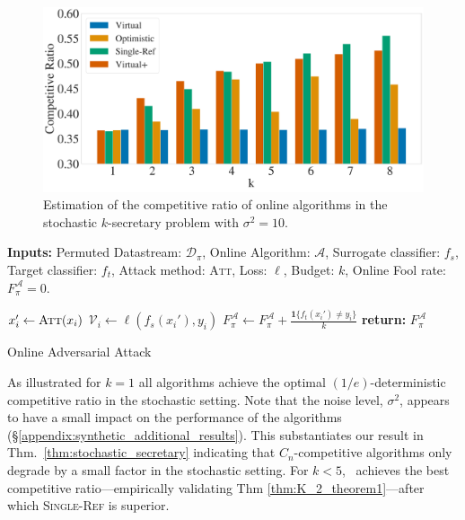 \begin{minipage}[t]{.48\textwidth}
\begin{figure}[H]
     \vspace{-15pt}
    \includegraphics[width=1.01\linewidth]{Figures/Competitive_Ratio3Bar8-Var-10.pdf}
    \vspace{-15pt}
    \caption{Estimation of the competitive ratio of online algorithms in the stochastic $k$-secretary problem with $\sigma^2=10$.}
    \label{fig:synthetic_data}
\end{figure}
\end{minipage}
\hfill
\begin{minipage}[t]{.48\textwidth}
\vspace{-15pt}  
    \begin{algorithm}[H]
    \small
    \textbf{Inputs:} Permuted Datastream: $\mathcal{D}_\pi$, Online Algorithm: $\mathcal{A}$,  Surrogate classifier: $f_s$, Target classifier: $f_t$,  Attack method: \textsc{Att}, Loss: $\ell$,  Budget: $k$,  
    Online Fool rate: $F^{\mathcal{A}}_\pi=0$.
    \begin{algorithmic}[1]
    \STATE $x_i' \leftarrow  \textsc{Att}(x_i)$ \hfill {}
    \STATE $\mathcal{V}_i \leftarrow \ell(f_s(x_i'),y_i)$  \hfill {}
    \STATE  $F^{\mathcal{A}}_\pi \leftarrow F^{\mathcal{A}}_\pi+\tfrac{\mathbf{1}\{f_t(x_i')\neq y_i\}}{k}$  \hfill{} 
    \ENDIF
    \ENDFOR
    \STATE \textbf{return:} $F^{\mathcal{A}}_\pi$ \hfill{} 
    \end{algorithmic}
     \caption{\small Online Adversarial Attack}
     \label{alg:online_adv_attack}
    \end{algorithm}
\end{minipage}

As illustrated for $k=1$ all algorithms achieve the optimal $(1/e)$-deterministic competitive ratio in the stochastic setting. Note that the noise level, $\sigma^2$, appears to have a small impact on the performance of the algorithms (\S\ref{appendix:synthetic_additional_results}). 
This substantiates our result in Thm.~\ref{thm:stochastic_secretary} indicating that $C_n$-competitive algorithms only degrade by a small factor in the stochastic setting. For $k<5$, \algoname\ achieves the best competitive ratio---empirically validating Thm \ref{thm:K_2_theorem1}---after which \textsc{Single-Ref} is superior.
